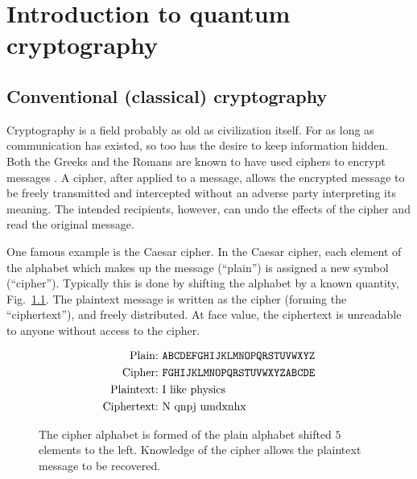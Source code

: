 \chapter{Introduction to quantum cryptography}\label{chapter:crypto_intro}

\section{Conventional (classical) cryptography}

Cryptography is a field probably as old as civilization itself. For as long as communication has existed, so too has the desire to keep information hidden. Both the Greeks and the Romans are known to have used ciphers to encrypt messages \cite{Singh1999}. A cipher, after applied to a message, allows the encrypted message to be freely transmitted and intercepted without an adverse party interpreting its meaning. The intended recipients, however, can undo the effects of the cipher and read the original message. 

One famous example is the Caesar cipher. In the Caesar cipher, each element of the alphabet which makes up the message (``plain'') is assigned a new symbol (``cipher''). Typically this is done by shifting the alphabet by a known quantity, Fig.~\ref{fig:caesar}. The plaintext message is written as the cipher (forming the ``ciphertext''), and freely distributed. At face value, the ciphertext is unreadable to anyone without access to the cipher.

\begin{figure}[htp]
\centering
\captionsetup{width=0.8\linewidth}
\begin{framed}
\begin{align*}
\text{Plain:} &\text{  \texttt{ABCDEFGHIJKLMNOPQRSTUVWXYZ}} \\
\text{Cipher:} &\text{  \texttt{FGHIJKLMNOPQRSTUVWXYZABCDE}} \\
\text{Plaintext:} &\text{  I like physics} \\
\text{Ciphertext:} &\text{  N qnpj umdxnhx}
\end{align*}
\end{framed}
\caption{\label{fig:caesar} The cipher alphabet is formed of the plain alphabet shifted $5$ elements to the left. Knowledge of the cipher allows the plaintext message to be recovered.}
\end{figure} %



